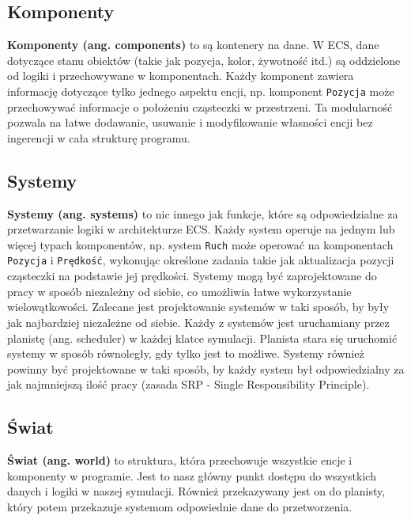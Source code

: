 \documentclass[11pt]{article}
\begin{document}
\subsection{Komponenty}
\textbf{Komponenty (ang. components)} to są kontenery na dane. W ECS, dane dotyczące stanu obiektów
(takie jak pozycja, kolor, żywotność itd.) są oddzielone od logiki i przechowywane w komponentach. Każdy
komponent zawiera informację dotyczące tylko jednego aspektu encji, np. komponent \texttt{Pozycja} może przechowywać
informacje o położeniu cząsteczki w przestrzeni. Ta modularność pozwala na łatwe dodawanie, usuwanie
i modyfikowanie własności encji bez ingerencji w cała strukturę programu.

\subsection{Systemy}
\textbf{Systemy (ang. systems)} to nic innego jak funkcje, które są odpowiedzialne za przetwarzanie logiki w architekturze ECS.
Każdy system operuje na jednym lub więcej typach komponentów, np. system \texttt{Ruch} może operować na komponentach
\texttt{Pozycja} i \texttt{Prędkość}, wykonując określone zadania takie jak aktualizacja pozycji cząsteczki na podstawie jej prędkości.
Systemy mogą być zaprojektowane do pracy w sposób niezależny od siebie, co umożliwia łatwe wykorzystanie wielowątkowości. 
Zalecane jest projektowanie systemów w taki sposób, by były jak najbardziej niezależne od siebie. Każdy z systemów
jest uruchamiany przez planistę (ang. scheduler) w każdej klatce symulacji. Planista stara się uruchomić systemy
w sposób równoległy, gdy tylko jest to możliwe. Systemy również powinny być projektowane w taki sposób, by
każdy system był odpowiedzialny za jak najmniejszą ilość pracy (zasada SRP - Single Responsibility Principle).

\subsection{Świat}
\textbf{Świat (ang. world)} to struktura, która przechowuje wszystkie encje i komponenty w programie.
Jest to nasz główny punkt dostępu do wszystkich danych i logiki w naszej symulacji. Również przekazywany
jest on do planisty, który potem przekazuje systemom odpowiednie dane do przetworzenia.
\end{document}
